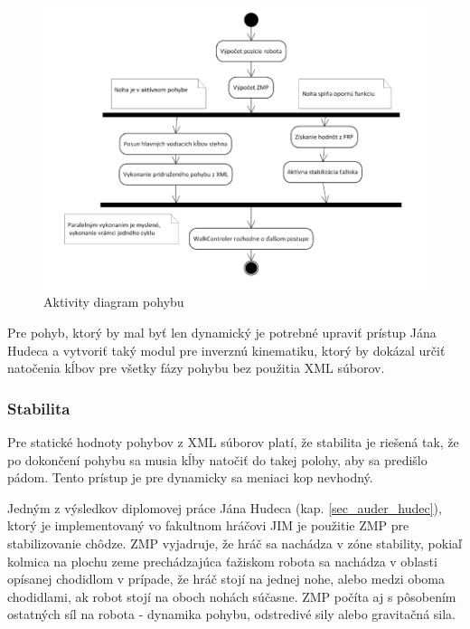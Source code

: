 \begin{figure}[H]
	\center
	\includegraphics[scale=1]{./data/hudec_pohyb_activity_diag}
	\caption{Aktivity diagram pohybu\cite{hudec}}
	\label{pic_hudec_pohyb_activity_diag}
\end{figure}

Pre pohyb, ktorý by mal byť len dynamický je potrebné upraviť prístup Jána Hudeca a vytvoriť taký modul pre inverznú kinematiku, ktorý by dokázal určiť natočenia kĺbov pre všetky fázy pohybu bez použitia XML súborov.
 
\subsubsection{Stabilita}
Pre statické hodnoty pohybov z XML súborov platí, že stabilita je riešená tak, že po dokončení pohybu sa musia kĺby natočiť do takej polohy, aby sa predišlo pádom. Tento prístup je pre dynamicky sa meniaci kop nevhodný.

Jedným z výsledkov diplomovej práce Jána Hudeca\cite{hudec} (kap. \ref{sec_auder_hudec}), ktorý je implementovaný vo fakultnom hráčovi JIM je použitie ZMP pre stabilizovanie chôdze.  
ZMP vyjadruje, že hráč sa nachádza v zóne stability, pokiaľ kolmica na plochu zeme prechádzajúca ťažiskom robota sa nachádza v oblasti opísanej chodidlom v prípade, že hráč stojí na jednej nohe, alebo medzi oboma chodidlami, ak robot stojí na oboch nohách súčasne. ZMP počíta aj s pôsobením ostatných síl na robota - dynamika pohybu, odstredivé sily alebo gravitačná sila.

